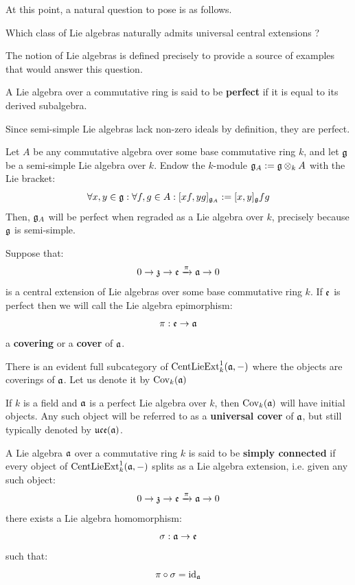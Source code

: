         At this point, a natural question to pose is as follows.
        \begin{question}
            Which class of Lie algebras naturally admits universal central extensions ? 
        \end{question}
        The notion of  Lie algebras is defined precisely to provide a source of examples that would answer this question.
        \begin{definition}
            A Lie algebra over a commutative ring is said to be \textbf{perfect} if it is equal to its derived subalgebra. 
        \end{definition}
        \begin{example}
            Since semi-simple Lie algebras lack non-zero ideals by definition, they are perfect. 
        \end{example}
        \begin{example}
            Let $A$ be any commutative algebra over some base commutative ring $k$, and let $\mathfrak{g}$ be a semi-simple Lie algebra over $k$. Endow the $k$-module $\g_A := \g \tensor_k A$ with the Lie bracket:
                $$\forall x, y \in \mathfrak{g}: \forall f, g \in A: [x f, y g]_{\mathfrak{g}_A} := [x, y]_{\mathfrak{g}} fg$$
            Then, $\mathfrak{g}_A$ will be perfect when regraded as a Lie algebra over $k$, precisely because $\mathfrak{g}$ is semi-simple.
        \end{example}
        \begin{definition}
            Suppose that:
                $$0 \to \mathfrak{z} \to \mathfrak{e} \xrightarrow[]{\pi} \mathfrak{a} \to 0$$
            is a central extension of Lie algebras over some base commutative ring $k$. If $\mathfrak{e}$ is perfect then we will call the Lie algebra epimorphism:
                $$\pi: \mathfrak{e} \to \mathfrak{a}$$
            a \textbf{covering} or a \textbf{cover} of $\mathfrak{a}$. 

            There is an evident full subcategory of $\mathrm{Cent}\mathrm{Lie}\mathrm{Ext}^1_k(\mathfrak{a}, -)$ where the objects are coverings of $\mathfrak{a}$. Let us denote it by $\mathrm{Cov}_k(\mathfrak{a})$
        \end{definition}
        \begin{proposition}
            If $k$ is a field and $\mathfrak{a}$ is a perfect Lie algebra over $k$, then $\mathrm{Cov}_k(\mathfrak{a})$ will have initial objects. Any such object will be referred to as a \textbf{universal cover} of $\mathfrak{a}$, but still typically denoted by $\mathfrak{uce}(\mathfrak{a})$.
        \end{proposition}
        \begin{definition}
            A Lie algebra $\mathfrak{a}$ over a commutative ring $k$ is said to be \textbf{simply connected} if every object of $\mathrm{Cent}\mathrm{Lie}\mathrm{Ext}^1_k(\mathfrak{a}, -)$ splits as a Lie algebra extension, i.e. given any such object:
                $$0 \to \mathfrak{z} \to \mathfrak{e} \xrightarrow[]{\pi} \mathfrak{a} \to 0$$
            there exists a Lie algebra homomorphism:
                $$\sigma: \mathfrak{a} \to \mathfrak{e}$$
            such that:
                $$\pi \circ \sigma = \mathrm{id}_{\mathfrak{a}}$$
        \end{definition}
